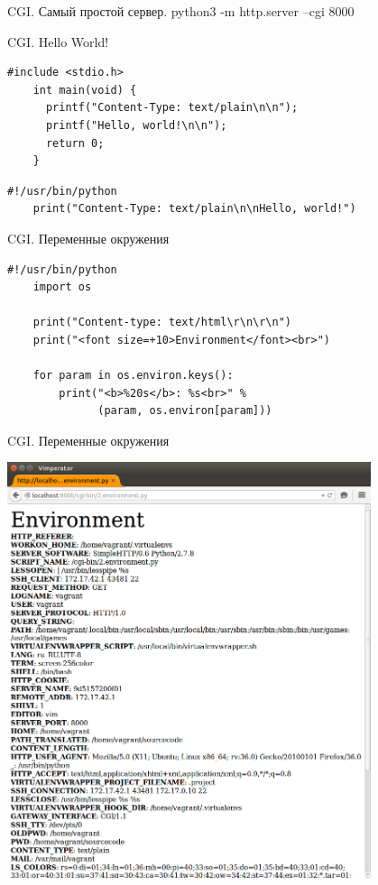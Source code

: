 \begin{frame}{CGI. Самый простой сервер.}
    python3 -m http.server --cgi 8000
\end{frame}

\begin{frame}[fragile]{CGI\@. Hello World!}

    \begin{lstlisting}[style=cpp, caption=Си]
    #include <stdio.h>
    int main(void) {
      printf("Content-Type: text/plain\n\n");
      printf("Hello, world!\n\n");
      return 0;
    }
    \end{lstlisting}

    \begin{lstlisting}[style=python, caption=Python]
    #!/usr/bin/python
    print("Content-Type: text/plain\n\nHello, world!")
    \end{lstlisting}
\end{frame}

\begin{frame}[fragile]{CGI\@. Переменные окружения}

    \begin{lstlisting}[style=python, caption=Python]
    #!/usr/bin/python
    import os

    print("Content-type: text/html\r\n\r\n")
    print("<font size=+10>Environment</font><br>")

    for param in os.environ.keys():
        print("<b>%20s</b>: %s<br>" %
              (param, os.environ[param]))
    \end{lstlisting}
\end{frame}

\begin{frame}[fragile]{CGI\@. Переменные окружения}
    \begin{center}
        \includegraphics[width=4.2in]{media/cgi_env.png}
    \end{center}
\end{frame}

